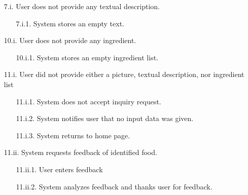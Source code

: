 \documentclass[]{article}
\begin{document}
\begin{enumerate}[{\bf BE1.}]
\begin{enumerate}[{\bf VP1.}]
\begin{enumerate}
				\end{enumerate}
				\begin{enumerate}
					\item[7.i.] User does not provide any textual description.
					\begin{enumerate}
						\item[7.i.1.] System stores an empty text.
					\end{enumerate}
				\end{enumerate}
				\begin{enumerate}
					\item[10.i.] User does not provide any ingredient.
					\begin{enumerate}
						\item[10.i.1.] System stores an empty ingredient list.
					\end{enumerate}
				\end{enumerate}
				\begin{enumerate}
					\item[11.i.] User did not provide either a picture, textual description, nor ingredient list
					\begin{enumerate}
						\item[11.i.1.] System does not accept inquiry request.
						\item[11.i.2.] System notifies user that no input data was given.
						\item[11.i.3.] System returns to home page.
					\end{enumerate}
					\item[11.ii.] System requests feedback of identified food.
					\begin{enumerate}
						\item[11.ii.1.] User enters feedback
						\item[11.ii.2.] System analyzes feedback and thanks user for feedback.
					\end{enumerate}
				\end{enumerate}


\end{enumerate}
\end{enumerate}
\end{document}
